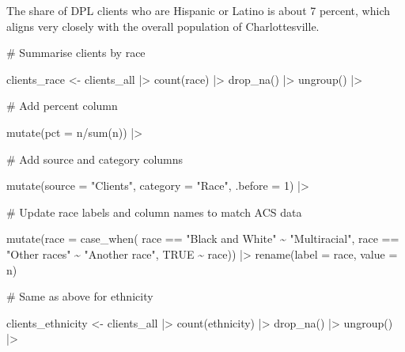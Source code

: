 \documentclass[
  letterpaper,
  DIV=11,
  numbers=noendperiod]{scrartcl}
\newenvironment{Shaded}{\begin{snugshade}}{\end{snugshade}}
\newcommand{\AttributeTok}[1]{\textcolor[rgb]{0.40,0.45,0.13}{#1}}
\newcommand{\CommentTok}[1]{\textcolor[rgb]{0.37,0.37,0.37}{#1}}
\newcommand{\ConstantTok}[1]{\textcolor[rgb]{0.56,0.35,0.01}{#1}}
\newcommand{\DecValTok}[1]{\textcolor[rgb]{0.68,0.00,0.00}{#1}}
\newcommand{\FunctionTok}[1]{\textcolor[rgb]{0.28,0.35,0.67}{#1}}
\newcommand{\NormalTok}[1]{\textcolor[rgb]{0.00,0.23,0.31}{#1}}
\newcommand{\OtherTok}[1]{\textcolor[rgb]{0.00,0.23,0.31}{#1}}
\newcommand{\SpecialCharTok}[1]{\textcolor[rgb]{0.37,0.37,0.37}{#1}}
\newcommand{\StringTok}[1]{\textcolor[rgb]{0.13,0.47,0.30}{#1}}
\begin{document}
The share of DPL clients who are Hispanic or Latino is about 7 percent,
which aligns very closely with the overall population of
Charlottesville.

\begin{Shaded}
\begin{Highlighting}[]
\CommentTok{\# Summarise clients by race}

\NormalTok{clients\_race }\OtherTok{\textless{}{-}}\NormalTok{ clients\_all }\SpecialCharTok{|\textgreater{}} 
  \FunctionTok{count}\NormalTok{(race) }\SpecialCharTok{|\textgreater{}} 
  \FunctionTok{drop\_na}\NormalTok{() }\SpecialCharTok{|\textgreater{}}
  \FunctionTok{ungroup}\NormalTok{() }\SpecialCharTok{|\textgreater{}} 
  
  \CommentTok{\# Add percent column}
  
  \FunctionTok{mutate}\NormalTok{(}\AttributeTok{pct =}\NormalTok{ n}\SpecialCharTok{/}\FunctionTok{sum}\NormalTok{(n)) }\SpecialCharTok{|\textgreater{}} 
  
  \CommentTok{\# Add source and category columns}
  
  \FunctionTok{mutate}\NormalTok{(}\AttributeTok{source =} \StringTok{"Clients"}\NormalTok{,}
         \AttributeTok{category =} \StringTok{"Race"}\NormalTok{,}
         \AttributeTok{.before =} \DecValTok{1}\NormalTok{) }\SpecialCharTok{|\textgreater{}} 
  
  \CommentTok{\# Update race labels and column names to match ACS data}
  
  \FunctionTok{mutate}\NormalTok{(}\AttributeTok{race =} \FunctionTok{case\_when}\NormalTok{(}
\NormalTok{    race }\SpecialCharTok{==} \StringTok{"Black and White"} \SpecialCharTok{\textasciitilde{}} \StringTok{"Multiracial"}\NormalTok{,}
\NormalTok{    race }\SpecialCharTok{==} \StringTok{"Other races"} \SpecialCharTok{\textasciitilde{}} \StringTok{"Another race"}\NormalTok{,}
    \ConstantTok{TRUE} \SpecialCharTok{\textasciitilde{}}\NormalTok{ race)) }\SpecialCharTok{|\textgreater{}} 
  \FunctionTok{rename}\NormalTok{(}\AttributeTok{label =}\NormalTok{ race,}
         \AttributeTok{value =}\NormalTok{ n)}

\CommentTok{\# Same as above for ethnicity}

\NormalTok{clients\_ethnicity }\OtherTok{\textless{}{-}}\NormalTok{ clients\_all }\SpecialCharTok{|\textgreater{}} 
  \FunctionTok{count}\NormalTok{(ethnicity) }\SpecialCharTok{|\textgreater{}} 
  \FunctionTok{drop\_na}\NormalTok{() }\SpecialCharTok{|\textgreater{}}
  \FunctionTok{ungroup}\NormalTok{() }\SpecialCharTok{|\textgreater{}} 
  

\end{Highlighting}
\end{Shaded}
\end{document}
